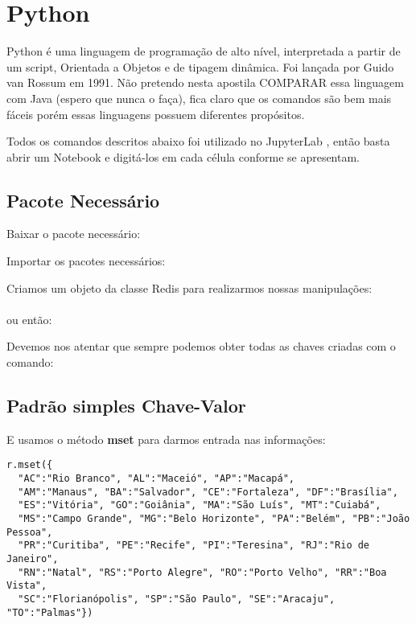 \section{Python}
Python é uma linguagem de programação de alto nível, interpretada a partir de um script, Orientada a Objetos e de tipagem dinâmica. Foi lançada por Guido van Rossum em 1991. Não pretendo nesta apostila COMPARAR essa linguagem com Java (espero que nunca o faça), fica claro que os comandos são bem mais fáceis porém essas linguagens possuem diferentes propósitos.

Todos os comandos descritos abaixo foi utilizado no JupyterLab \cite{jupyteroficial}, então basta abrir um Notebook e digitá-los em cada célula conforme se apresentam.

\subsection{Pacote Necessário}
Baixar o pacote necessário: \\

Importar os pacotes necessários: \\

Criamos um objeto da classe Redis para realizarmos nossas manipulações: \\
 \\
ou então: \\

Devemos nos atentar que sempre podemos obter todas as chaves criadas com o comando: \\

\subsection{Padrão simples Chave-Valor}
E usamos o método \textbf{mset} para darmos entrada nas informações:
\begin{lstlisting}[]
r.mset({
  "AC":"Rio Branco", "AL":"Maceió", "AP":"Macapá",
  "AM":"Manaus", "BA":"Salvador", "CE":"Fortaleza", "DF":"Brasília",
  "ES":"Vitória", "GO":"Goiânia", "MA":"São Luís", "MT":"Cuiabá",
  "MS":"Campo Grande", "MG":"Belo Horizonte", "PA":"Belém", "PB":"João Pessoa",
  "PR":"Curitiba", "PE":"Recife", "PI":"Teresina", "RJ":"Rio de Janeiro",
  "RN":"Natal", "RS":"Porto Alegre", "RO":"Porto Velho", "RR":"Boa Vista",
  "SC":"Florianópolis", "SP":"São Paulo", "SE":"Aracaju", "TO":"Palmas"})
\end{lstlisting}

